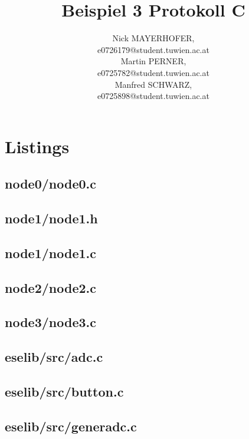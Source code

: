 \documentclass[12pt,a4paper,titlepage,oneside]{article}
\title{Beispiel 3 Protokoll C}
\author{ Nick MAYERHOFER, \matrnr 0726179    \\
        {\small e0726179@student.tuwien.ac.at} \\
	Martin PERNER, \matrnr 0725782    \\
         {\small e0725782@student.tuwien.ac.at} \\
	Manfred SCHWARZ, \matrnr  0725898   \\
         {\small e0725898@student.tuwien.ac.at}
}
\begin{document}
\maketitle

\tableofcontents
\newpage

%


\newpage
\section{Listings}

\subsection{node0/node0.c}

\newpage
\subsection{node1/node1.h}

\newpage
\subsection{node1/node1.c}

\newpage
\subsection{node2/node2.c}

\newpage
\subsection{node3/node3.c}

\newpage
\subsection{eselib/src/adc.c}

%
\newpage
\subsection{eselib/src/button.c}

\newpage
\subsection{eselib/src/generadc.c}

\newpage
\end{document}
